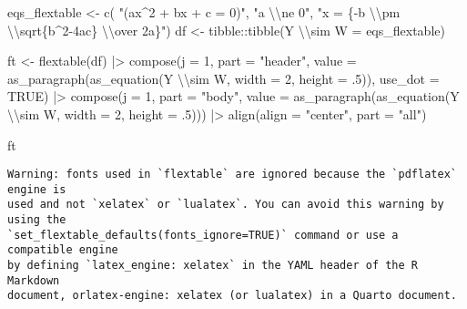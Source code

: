 \documentclass[
  letterpaper,
  DIV=11,
  numbers=noendperiod]{scrartcl}
\newenvironment{Shaded}{\begin{snugshade}}{\end{snugshade}}
\newcommand{\AttributeTok}[1]{\textcolor[rgb]{0.40,0.45,0.13}{#1}}
\newcommand{\ConstantTok}[1]{\textcolor[rgb]{0.56,0.35,0.01}{#1}}
\newcommand{\DecValTok}[1]{\textcolor[rgb]{0.68,0.00,0.00}{#1}}
\newcommand{\FunctionTok}[1]{\textcolor[rgb]{0.28,0.35,0.67}{#1}}
\newcommand{\NormalTok}[1]{\textcolor[rgb]{0.00,0.23,0.31}{#1}}
\newcommand{\OtherTok}[1]{\textcolor[rgb]{0.00,0.23,0.31}{#1}}
\newcommand{\SpecialCharTok}[1]{\textcolor[rgb]{0.37,0.37,0.37}{#1}}
\newcommand{\StringTok}[1]{\textcolor[rgb]{0.13,0.47,0.30}{#1}}
\begin{document}
\begin{Shaded}
\begin{Highlighting}[]
\NormalTok{eqs\_flextable }\OtherTok{\textless{}{-}} \FunctionTok{c}\NormalTok{(}
    \StringTok{"(ax\^{}2 + bx + c = 0)"}\NormalTok{,}
    \StringTok{"a }\SpecialCharTok{\textbackslash{}\textbackslash{}}\StringTok{ne 0"}\NormalTok{,}
    \StringTok{"x = \{{-}b }\SpecialCharTok{\textbackslash{}\textbackslash{}}\StringTok{pm }\SpecialCharTok{\textbackslash{}\textbackslash{}}\StringTok{sqrt\{b\^{}2{-}4ac\} }\SpecialCharTok{\textbackslash{}\textbackslash{}}\StringTok{over 2a\}"}\NormalTok{)}
\NormalTok{df }\OtherTok{\textless{}{-}}\NormalTok{ tibble}\SpecialCharTok{::}\FunctionTok{tibble}\NormalTok{(}\StringTok{\textasciigrave{}}\AttributeTok{Y }\SpecialCharTok{\textbackslash{}\textbackslash{}}\AttributeTok{sim W}\StringTok{\textasciigrave{}} \OtherTok{=}\NormalTok{ eqs\_flextable)}


\NormalTok{ft }\OtherTok{\textless{}{-}} \FunctionTok{flextable}\NormalTok{(df) }\SpecialCharTok{|\textgreater{}}
  \FunctionTok{compose}\NormalTok{(}\AttributeTok{j =} \DecValTok{1}\NormalTok{, }\AttributeTok{part =} \StringTok{"header"}\NormalTok{,}
          \AttributeTok{value =} \FunctionTok{as\_paragraph}\NormalTok{(}\FunctionTok{as\_equation}\NormalTok{(}\StringTok{\textasciigrave{}}\AttributeTok{Y }\SpecialCharTok{\textbackslash{}\textbackslash{}}\AttributeTok{sim W}\StringTok{\textasciigrave{}}\NormalTok{, }\AttributeTok{width =} \DecValTok{2}\NormalTok{, }\AttributeTok{height =}\NormalTok{ .}\DecValTok{5}\NormalTok{)),}
          \AttributeTok{use\_dot =} \ConstantTok{TRUE}\NormalTok{) }\SpecialCharTok{|\textgreater{}}
  \FunctionTok{compose}\NormalTok{(}\AttributeTok{j =} \DecValTok{1}\NormalTok{, }\AttributeTok{part =} \StringTok{"body"}\NormalTok{,}
          \AttributeTok{value =} \FunctionTok{as\_paragraph}\NormalTok{(}\FunctionTok{as\_equation}\NormalTok{(}\StringTok{\textasciigrave{}}\AttributeTok{Y }\SpecialCharTok{\textbackslash{}\textbackslash{}}\AttributeTok{sim W}\StringTok{\textasciigrave{}}\NormalTok{, }\AttributeTok{width =} \DecValTok{2}\NormalTok{, }\AttributeTok{height =}\NormalTok{ .}\DecValTok{5}\NormalTok{))) }\SpecialCharTok{|\textgreater{}}
  \FunctionTok{align}\NormalTok{(}\AttributeTok{align =} \StringTok{"center"}\NormalTok{, }\AttributeTok{part =} \StringTok{"all"}\NormalTok{)}

\NormalTok{ft}
\end{Highlighting}
\end{Shaded}

\begin{verbatim}
Warning: fonts used in `flextable` are ignored because the `pdflatex` engine is
used and not `xelatex` or `lualatex`. You can avoid this warning by using the
`set_flextable_defaults(fonts_ignore=TRUE)` command or use a compatible engine
by defining `latex_engine: xelatex` in the YAML header of the R Markdown
document, orlatex-engine: xelatex (or lualatex) in a Quarto document.
\end{verbatim}
\end{document}
